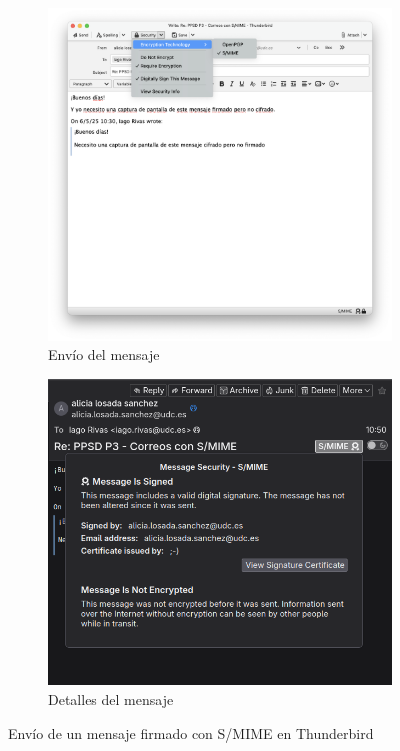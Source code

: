 \begin{figure}[H]
    \centering
    \begin{subfigure}{.5\textwidth}
        \centering
        \includegraphics[width=\linewidth]{thunderbird-smime-firmado.png}
        \caption{Envío del mensaje}
    \end{subfigure}%
    \begin{subfigure}{.5\textwidth}
        \centering
        \includegraphics[width=\linewidth]{thunderbird-smime-detalles-firmado.png}
        \caption{Detalles del mensaje}
    \end{subfigure}
    \caption{Envío de un mensaje firmado con S/MIME en Thunderbird}
\end{figure}

